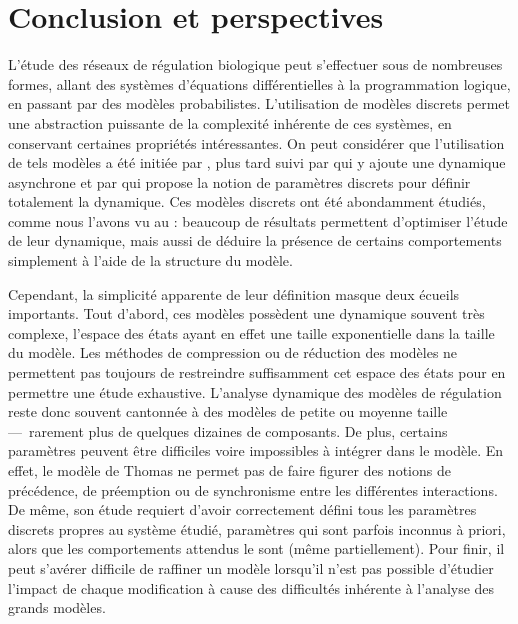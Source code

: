 
\chapter{Conclusion et perspectives}




L'étude des réseaux de régulation biologique peut s'effectuer sous de nombreuses formes,
allant des systèmes d'équations différentielles à la programmation logique,
en passant par des modèles probabilistes.
L'utilisation de modèles discrets permet une abstraction puissante de la complexité inhérente
de ces systèmes, en conservant certaines propriétés intéressantes.
On peut considérer que l'utilisation de tels modèles a été initiée par
, plus tard suivi par 
qui y ajoute une dynamique asynchrone
et par 
qui propose la notion de paramètres discrets pour définir totalement la dynamique.
Ces modèles discrets ont été abondamment étudiés,
comme nous l'avons vu au  :
beaucoup de résultats permettent d'optimiser l'étude de leur dynamique,
mais aussi de déduire la présence de certains comportements
simplement à l'aide de la structure du modèle.

Cependant, la simplicité apparente de leur définition masque deux écueils importants.
Tout d'abord, ces modèles possèdent une dynamique souvent très complexe,
l'espace des états ayant en effet une taille exponentielle dans la taille du modèle.
Les méthodes de compression ou de réduction des modèles ne permettent pas toujours
de restreindre suffisamment cet espace des états pour en permettre une étude exhaustive.
L'analyse dynamique des modèles de régulation reste donc souvent cantonnée
à des modèles de petite ou moyenne taille ---~rarement plus de quelques dizaines de composants.
De plus, certains paramètres peuvent être difficiles voire impossibles à intégrer dans le modèle.
En effet, le modèle de Thomas ne permet pas de faire figurer des notions de précédence,
de préemption ou de synchronisme entre les différentes interactions.
De même, son étude requiert d'avoir correctement défini tous les paramètres discrets
propres au système étudié, paramètres qui sont parfois inconnus à priori,
alors que les comportements attendus le sont (même partiellement).
Pour finir, il peut s'avérer difficile de raffiner un modèle lorsqu'il n'est pas
possible d'étudier l'impact de chaque modification
à cause des difficultés inhérente à l'analyse des grands modèles.

